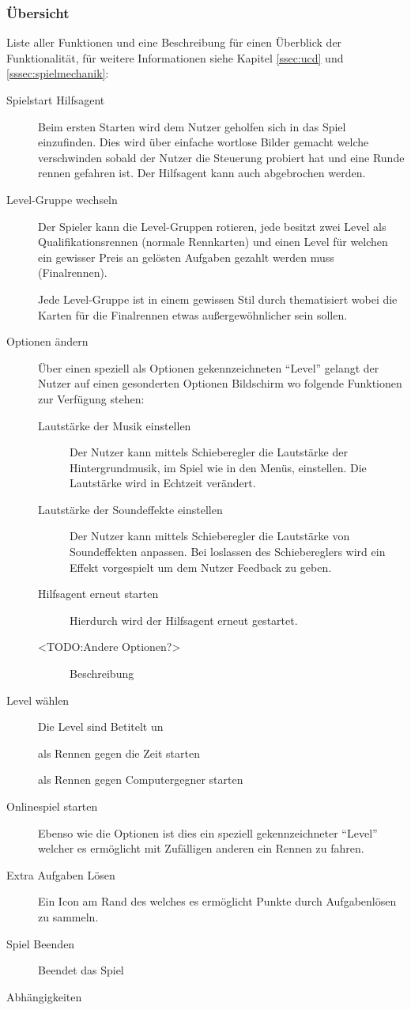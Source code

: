 	\subsubsection{Übersicht}
		Liste aller Funktionen und eine Beschreibung für einen Überblick der Funktionalität, für weitere Informationen siehe Kapitel \ref{ssec:ucd} und \ref{sssec:spielmechanik}:
		\begin{description}
			\item[Spielstart Hilfsagent]{ Beim ersten Starten wird dem Nutzer geholfen sich in das Spiel einzufinden. Dies wird über einfache wortlose Bilder gemacht welche verschwinden sobald der Nutzer die Steuerung probiert hat und eine Runde rennen gefahren ist. Der Hilfsagent kann auch abgebrochen werden. }
			\item[Level-Gruppe wechseln]{
				Der Spieler kann die Level-Gruppen rotieren, jede besitzt zwei Level als Qualifikationsrennen (normale Rennkarten) und einen Level für welchen ein gewisser Preis an gelösten Aufgaben gezahlt werden muss (Finalrennen).

				Jede Level-Gruppe ist in einem gewissen Stil durch thematisiert wobei die Karten für die Finalrennen etwas außergewöhnlicher sein sollen.
			}
			\item[Optionen ändern]{ Über einen speziell als Optionen gekennzeichneten \enquote{Level} gelangt der Nutzer auf einen gesonderten Optionen Bildschirm wo folgende Funktionen zur Verfügung stehen:
				\begin{description}
					\item[Lautstärke der Musik einstellen]{ Der Nutzer kann mittels Schieberegler die Lautstärke der Hintergrundmusik, im Spiel wie in den Menüs, einstellen. Die Lautstärke wird in Echtzeit verändert. }
					\item[Lautstärke der Soundeffekte einstellen]{ Der Nutzer kann mittels Schieberegler die Lautstärke von Soundeffekten anpassen. Bei loslassen des Schiebereglers wird ein Effekt vorgespielt um dem Nutzer Feedback zu geben. }
					\item[Hilfsagent erneut starten]{ Hierdurch wird der Hilfsagent erneut gestartet. }
					\item[<TODO:Andere Optionen?>]{ Beschreibung }
				\end{description}
			}
			\item[Level wählen]{ Die Level sind Betitelt un
				\begin{description}
					\item[als Rennen gegen die Zeit starten]{  }
					\item[als Rennen gegen Computergegner starten]{  }
				\end{description}
			}
			\item[Onlinespiel starten]{ Ebenso wie die Optionen ist dies ein speziell gekennzeichneter \enquote{Level} welcher es ermöglicht mit Zufälligen anderen ein Rennen zu fahren. }
			\item[Extra Aufgaben Lösen]{ Ein Icon am Rand des welches es ermöglicht Punkte durch Aufgabenlösen zu sammeln.  }
			\item[Spiel Beenden]{ Beendet das Spiel }
		\end{description}
		Abhängigkeiten
